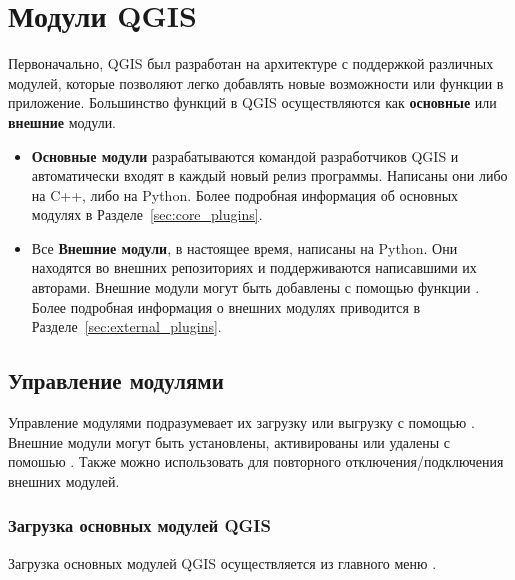 
\chapter{Модули QGIS}\label{sec:plugins}


Первоначально, QGIS был разработан на архитектуре с поддержкой различных
модулей, которые позволяют легко добавлять новые возможности или функции
в приложение. Большинство функций в QGIS осуществляются как
\textbf{основные} или \textbf{внешние} модули.

\begin{itemize}[label=--]
\item \textbf{Основные модули} разрабатываются командой разработчиков
QGIS и автоматически входят в каждый новый релиз программы. Написаны они
либо на C++, либо на Python. Более подробная информация об основных
модулях в Разделе~\ref{sec:core_plugins}.
\item Все \textbf{Внешние модули}, в настоящее время, написаны на
Python. Они находятся во внешних репозиториях и поддерживаются
написавшими их авторами. Внешние модули могут быть добавлены с помощью
функции . Более подробная информация
о внешних модулях приводится в Разделе~\ref{sec:external_plugins}.
\end{itemize}

\section{Управление модулями}\label{sec:managing_plugins}

Управление модулями подразумевает их загрузку или выгрузку с помощью
. Внешние модули могут быть установлены,
активированы или удалены с помошью .
Также  можно использовать для повторного
отключения/подключения внешних модулей.

\subsection{Загрузка основных модулей QGIS}\label{sec:load_core_plugin}

Загрузка основных модулей QGIS осуществляется из главного меню
 \arrow
{}.

